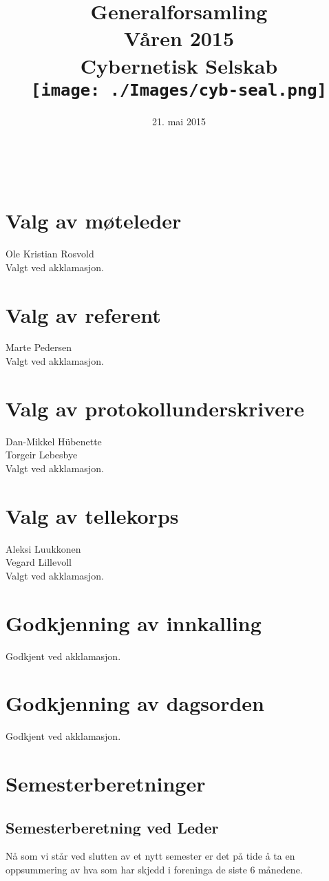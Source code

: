 \documentclass[10pt,norsk,a4paper]{article}
\title{Generalforsamling\\
	Våren 2015\\
	Cybernetisk Selskab\\[.3cm]
	\texttt{[image: ./Images/cyb-seal.png]}\\[-.5cm]}
\date{21. mai 2015}
\begin{document}
\maketitle{}
\tableofcontents{}

~\\

\section{Valg av møteleder}
Ole Kristian Rosvold\\
Valgt ved akklamasjon.

\section{Valg av referent}
Marte Pedersen\\
Valgt ved akklamasjon.

\section{Valg av protokollunderskrivere}
Dan-Mikkel Hübenette\\
Torgeir Lebesbye\\
Valgt ved akklamasjon.

\section{Valg av tellekorps}
Aleksi Luukkonen\\
Vegard Lillevoll\\
Valgt ved akklamasjon.

\section{Godkjenning av innkalling}
Godkjent ved akklamasjon.

\section{Godkjenning av dagsorden}
Godkjent ved akklamasjon.

\newpage


\section{Semesterberetninger}
\subsection{Semesterberetning ved Leder}
Nå som vi står ved slutten av et nytt semester er det på tide å ta en oppsummering av hva som har skjedd i foreninga de siste 6 månedene.\\
\end{document}
